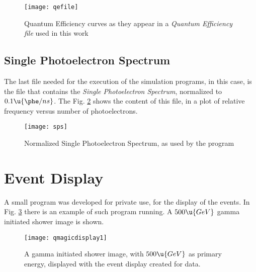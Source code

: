\begin{figure}[htbp]
  \centering
  \texttt{[image: qefile]}
  \caption{Quantum Efficiency curves as they appear in a 
    \emph{Quantum Efficiency file} used in this work}
  \label{fig:qefile}
\end{figure}


\subsection{Single Photoelectron Spectrum}
\label{sec:sps}

The last file needed for the execution of the simulation programs,
\camera in this case, is the file that contains the \emph{Single
  Photoelectron Spectrum}, normalized to $0.1\u{\phe/ns}$. The Fig.
\ref{fig:sps} shows the content of this file, in a plot of relative
frequency versus number of photoelectrons.

\begin{figure}[htbp]
  \centering
  \texttt{[image: sps]}
  \caption{Normalized Single Photoelectron Spectrum, as used by 
    the program \camera}
  \label{fig:sps}
\end{figure}



\section{Event Display}
\label{sec:eventdisplay}

A small program was developed for private use, for the display of the
events. In Fig. \ref{fig:qmagicdisplay} there is an example of such
program running. A $500\u{GeV}$ gamma initiated shower image is shown.

\begin{figure}[htbp]
  \centering
  \texttt{[image: qmagicdisplay1]}
  \caption{A gamma initiated shower image, with $500\u{GeV}$ as primary
    energy, displayed with the event display created for \MAGIC \MC
    data.}
  \label{fig:qmagicdisplay}
\end{figure}


\endinput
%

